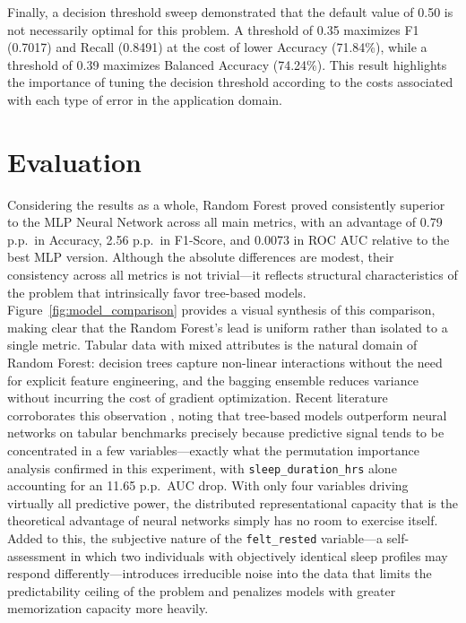 \documentclass[conference]{IEEEtran}
\begin{document}
Finally, a decision threshold sweep demonstrated that the default value of 0.50 is not necessarily optimal for this problem. A threshold of 0.35 maximizes F1 (0.7017) and Recall (0.8491) at the cost of lower Accuracy (71.84\%), while a threshold of 0.39 maximizes Balanced Accuracy (74.24\%). This result highlights the importance of tuning the decision threshold according to the costs associated with each type of error in the application domain.

\section{Evaluation}

Considering the results as a whole, Random Forest proved consistently superior to the MLP Neural Network across all main metrics, with an advantage of 0.79 p.p.\ in Accuracy, 2.56 p.p.\ in F1-Score, and 0.0073 in ROC AUC relative to the best MLP version. Although the absolute differences are modest, their consistency across all metrics is not trivial---it reflects structural characteristics of the problem that intrinsically favor tree-based models. Figure~\ref{fig:model_comparison} provides a visual synthesis of this comparison, making clear that the Random Forest's lead is uniform rather than isolated to a single metric. Tabular data with mixed attributes is the natural domain of Random Forest: decision trees capture non-linear interactions without the need for explicit feature engineering, and the bagging ensemble reduces variance without incurring the cost of gradient optimization. Recent literature corroborates this observation \cite{grinsztajn2022}, noting that tree-based models outperform neural networks on tabular benchmarks precisely because predictive signal tends to be concentrated in a few variables---exactly what the permutation importance analysis confirmed in this experiment, with \texttt{sleep\_duration\_hrs} alone accounting for an 11.65 p.p.\ AUC drop. With only four variables driving virtually all predictive power, the distributed representational capacity that is the theoretical advantage of neural networks simply has no room to exercise itself. Added to this, the subjective nature of the \texttt{felt\_rested} variable---a self-assessment in which two individuals with objectively identical sleep profiles may respond differently---introduces irreducible noise into the data that limits the predictability ceiling of the problem and penalizes models with greater memorization capacity more heavily.
\end{document}
